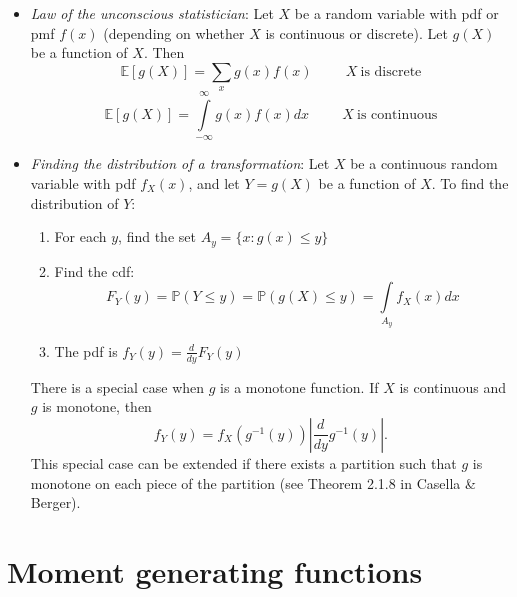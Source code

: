 \documentclass[11pt]{article}
\begin{document}
\begin{itemize}

\item \textit{Law of the unconscious statistician}: Let $X$ be a random variable with pdf or pmf $f(x)$ (depending on whether $X$ is continuous or discrete). Let $g(X)$ be a function of $X$. Then
$$\mathbb{E}[g(X)] = \sum_x g(x) f(x) \hspace{1cm} X \ \text{is discrete}$$
$$\mathbb{E}[g(X)] = \int \limits_{-\infty}^{\infty} g(x) f(x) dx \hspace{1cm} X \ \text{is continuous}$$

\item \textit{Finding the distribution of a transformation}: Let $X$ be a continuous random variable with pdf $f_X(x)$, and let $Y = g(X)$ be a function of $X$. To find the distribution of $Y$:
\begin{enumerate}
\item For each $y$, find the set $A_y = \{x: g(x) \leq y\}$
\item Find the cdf:
$$F_Y(y) = \mathbb{P}(Y \leq y) = \mathbb{P}(g(X) \leq y) = \int \limits_{A_y} f_X(x) dx$$
\item The pdf is $f_Y(y) = \frac{d}{dy} F_Y(y)$
\end{enumerate}

There is a special case when $g$ is a monotone function. If $X$ is continuous and $g$ is monotone, then
$$f_Y(y) = f_X(g^{-1}(y)) \left| \frac{d}{dy} g^{-1}(y) \right|.$$
This special case can be extended if there exists a partition such that $g$ is monotone on each piece of the partition (see Theorem 2.1.8 in Casella \& Berger).

\end{itemize}

\section*{Moment generating functions}
\end{document}
